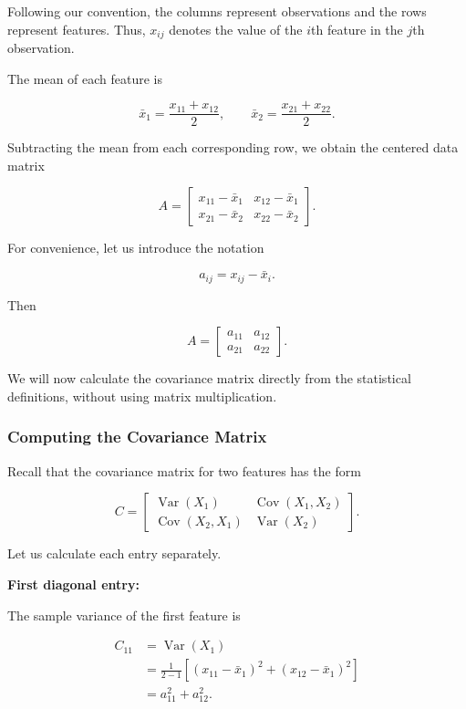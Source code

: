 \documentclass[11pt]{article}
\begin{document}
Following our convention, the columns
represent observations and the rows
represent features. Thus, $x_{ij}$
denotes the value of the $i$th feature
in the $j$th observation.

The mean of each feature is

\[
\bar{x}_1=\frac{x_{11}+x_{12}}{2},
\qquad
\bar{x}_2=\frac{x_{21}+x_{22}}{2}.
\]

Subtracting the mean from each
corresponding row, we obtain
the centered data matrix

\[
A=
\begin{bmatrix}
x_{11}-\bar{x}_1 & x_{12}-\bar{x}_1\\
x_{21}-\bar{x}_2 & x_{22}-\bar{x}_2
\end{bmatrix}.
\]

For convenience, let us introduce
the notation

\[
a_{ij}=x_{ij}-\bar{x}_i.
\]

Then

\[
\boxed{
A=
\begin{bmatrix}
a_{11} & a_{12}\\
a_{21} & a_{22}
\end{bmatrix}.
}
\]

We will now calculate the covariance
matrix directly from the statistical
definitions, without using matrix
multiplication.

\subsubsection*{Computing the Covariance
Matrix}

Recall that the covariance matrix
for two features has the form

\[
C=
\begin{bmatrix}
\operatorname{Var}(X_1) &
\operatorname{Cov}(X_1,X_2)\\
\operatorname{Cov}(X_2,X_1) &
\operatorname{Var}(X_2)
\end{bmatrix}.
\]

Let us calculate each entry separately.

\textbf{First diagonal entry:}

The sample variance of the first
feature is

\[
\begin{aligned}
C_{11}
&=\operatorname{Var}(X_1)\\
&=\frac{1}{2-1}
\left[
(x_{11}-\bar{x}_1)^2
+
(x_{12}-\bar{x}_1)^2
\right]\\
&=a_{11}^2+a_{12}^2.
\end{aligned}
\]
\end{document}
